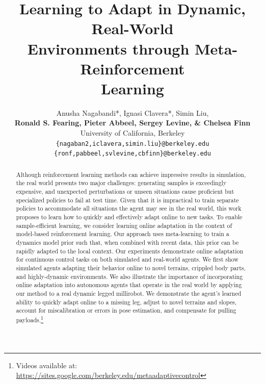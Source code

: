 \documentclass{article} %
\title{
Learning to Adapt in Dynamic, Real-World\\ Environments through Meta-Reinforcement\\ Learning
}
\author{Anusha Nagabandi*, Ignasi Clavera*, Simin Liu,\\
\textbf{Ronald S. Fearing, Pieter Abbeel, Sergey Levine, \& Chelsea Finn}\\
University of California, Berkeley \\
\texttt{\{nagaban2,iclavera,simin.liu\}@berkeley.edu} \\
\texttt{\{ronf,pabbeel,svlevine,cbfinn\}@berkeley.edu}
}
\begin{document}
\maketitle

\begin{abstract}

Although reinforcement learning methods can achieve impressive results in simulation, the real world presents two major challenges: generating samples is exceedingly expensive, and unexpected perturbations or unseen situations cause proficient but specialized policies to fail at test time. Given that it is impractical to train separate policies to accommodate all situations the agent may see in the real world, this work proposes to learn how to quickly and effectively adapt online to new tasks. To enable sample-efficient learning, we consider learning online adaptation in the context of model-based reinforcement learning. Our approach uses meta-learning to train a dynamics model prior such that, when combined with recent data, this prior can be rapidly adapted to the local context. Our experiments demonstrate online adaptation for continuous control tasks on both simulated and real-world agents. We first show simulated agents adapting their behavior online to novel terrains, crippled body parts, and highly-dynamic environments. We also illustrate the importance of incorporating online adaptation into autonomous agents that operate in the real world by applying our method to a real dynamic legged millirobot. We demonstrate the agent's learned ability to quickly adapt online to a missing leg, adjust to novel terrains and slopes, account for miscalibration or errors in pose estimation, and compensate for pulling payloads.\footnote{Videos available at: \url{https://sites.google.com/berkeley.edu/metaadaptivecontrol}}
\end{abstract}








\newpage
{\small


}

\newpage
\appendix

\end{document}
